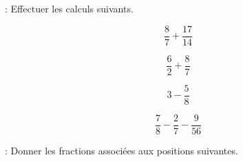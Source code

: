  : Effectuer les calculs suivants.

\begin{multicols}{2}
    $$\dfrac{8}{7}+\dfrac{17}{14}$$\vspace*{-0.5em}
    
    $$\dfrac{6}{2}+\dfrac{8}{7}$$\vspace*{-0.5em}

    \columnbreak
    $$3-\dfrac{5}{8}$$\vspace*{-0.5em}

    $$\dfrac{7}{8}-\dfrac{2}{7}-\dfrac{9}{56}$$\vspace*{-0.5em}

\end{multicols}


 : Donner les fractions associées aux positions suivantes.

\newcommand{\fracdgmult}[5][1]{
\tikzmath{\den=#2; \ya =#3;  \rcl= #1 ; \pas=1/\den ; \yb =\ya +1; \dprt = \ya - \rcl * \pas; \y2 =\dprt +\pas; \fin =\dprt +17*\pas ; \grad = 0.1/\den ; } %
\begin{figure}[H]
    \centering
    \begin{tikzpicture}[scale=\den]
        \draw (\dprt,0) -- (\fin,0) node[midway, sloped]{};
        \foreach \x in {\dprt,\y2,...,\fin}
        {
          \pgfmathparse{int(Mod(\x * \den +\pas ,\den))}
          \ifnum\pgfmathresult>0
            \draw (\x,\grad) -- (\x,-\grad) ;
          \else 
            \draw[ultra thick] (\x,2*\grad) -- (\x,-2*\grad) ;
          \fi
        }
        \foreach \z [count=\zi] in {#4 * \pas , #5 * \pas}
        {
          \draw[-Stealth] (\z,5*\grad) node [above] {\filling[1cm]}--(\z,1.5*\grad);
        }
        \node (A) at (\ya,-2*\grad) [below] {\pgfmathprintnumber[use comma]{\ya}} ;
        \node (B) at (\yb,-2*\grad) [below] {\pgfmathprintnumber[use comma]{\yb}} ;
    \end{tikzpicture} 
\end{figure}}

